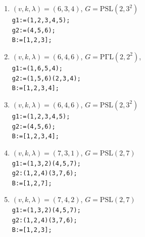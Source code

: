 \documentclass[a4paper,twopage,reqno,12pt]{amsart}
\theoremstyle{definition}
\numberwithin{equation}{section}
\newcommand{\PSL}{\mathrm{PSL}}
\newcommand{\PGaL}{\mathrm{P\Gamma L}}
\newcommand{\PSigL}{\mathrm{P\Sigma L}}
\newcommand{\Aut}{\mathrm{Aut}}
\begin{document}
\begin{enumerate}
     \item\label{634_2}$(v,k,\lambda)=(6,3,4)$, $G=\PSL(2,3^2)$\\
    \texttt{g1:=(1,2,3,4,5);}\\
    \texttt{g2:=(4,5,6);}\\
    \texttt{B:=[1,2,3];}\\

    \item\label{646_1}$(v,k,\lambda)=(6,4,6)$, $G=\PGaL(2,2^2)$, \\
    \texttt{g1:=(1,6,5,4);}\\
    \texttt{g2:=(1,5,6)(2,3,4);}\\
    \texttt{B:=[1,2,3,4];}\\

    \item\label{646_2}$(v,k,\lambda)=(6,4,6)$,  $G=\PSL(2,3^2)$ \\
    \texttt{g1:=(1,2,3,4,5);}\\
    \texttt{g2:=(4,5,6);}\\
    \texttt{B:=[1,2,3,4];}\\

    \item\label{731} $(v,k,\lambda)=(7,3,1)$, $G=\PSL(2,7)$ \\
    \texttt{g1:=(1,3,2)(4,5,7);}\\
    \texttt{g2:(1,2,4)(3,7,6);}\\
    \texttt{B:=[1,2,7];}\\

 \item\label{742} $(v,k,\lambda)=(7,4,2)$, $G=\PSL(2,7)$\\
    \texttt{g1:=(1,3,2)(4,5,7);}\\
    \texttt{g2:(1,2,4)(3,7,6);}\\
    \texttt{B:=[1,2,3];}\\   


\end{enumerate}
\end{document}
